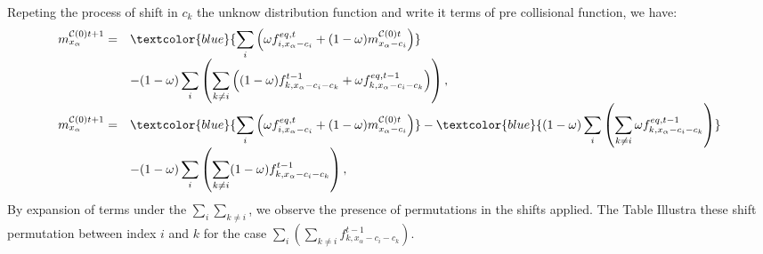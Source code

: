 \documentclass[letterpaper,10pt,english,openany,oneside]{jupyterBook}
\begin{document}
\sphinxAtStartPar
Repeting the process of shift in \(c_{k}\) the unknow distribution function and write it terms of pre collisional function, we have:
\begin{equation}\label{equation:Refs/LBM-Study/FDM-Belloti/General-FDM-Single-Relaxation:SRT-FDM-Exp-Step1-0}
\begin{split}
\begin{array}{rl}
m_{x_{\alpha}}^{\mathcal{C}(0)t+1} = & \textcolor{blue}{\displaystyle\sum_{i}\left(\omega f_{i,x_{\alpha}-c_{i}}^{eq,t} + (1-\omega)m_{x_{\alpha}-c_{i}}^{\mathcal{C}(0)t} \right)} \\
&- (1-\omega) \displaystyle\sum_{i}\left( \sum_{k\neq i} \left( (1-\omega)f_{k,x_{\alpha}-c_{i}-c_{k}}^{t-1}  + \omega f_{k,x_{\alpha}-c_{i}-c_{k}}^{eq,t-1}  \right) \right), \\
m_{x_{\alpha}}^{\mathcal{C}(0)t+1} = & \textcolor{blue}{\displaystyle\sum_{i}\left(\omega f_{i,x_{\alpha}-c_{i}}^{eq,t} + (1-\omega)m_{x_{\alpha}-c_{i}}^{\mathcal{C}(0)t} \right)} - \textcolor{blue}{(1-\omega) \displaystyle\sum_{i}\left( \sum_{k\neq i} \omega f_{k,x_{\alpha}-c_{i}-c_{k}}^{eq,t-1} \right)} \\
&- (1-\omega) \displaystyle\sum_{i}\left( \sum_{k\neq i}  (1-\omega)f_{k,x_{\alpha}-c_{i}-c_{k}}^{t-1}  \right),
\end{array}
\end{split}
\end{equation}
\sphinxAtStartPar
By expansion of terms under the \(\sum_{i} \sum_{k\neq i}\), we observe the presence of permutations in the shifts applied. The Table  Illustra these shift permutation between index \(i\) and \(k\) for the case \(\sum_{i}\left( \sum_{k\neq i}  f_{k,x_{\alpha}-c_{i}-c_{k}}^{t-1} \right)\).
\end{document}
